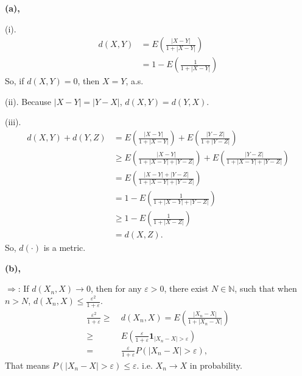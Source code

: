 \documentclass[en, normal, 11pt, black]{elegantnote}
\newenvironment{solution}{\begin{tcolorbox}[colback=white, colframe=black!50, breakable, title=Solution. ]\setlength{\parskip}{0.8em}}{\end{tcolorbox}}
\begin{document}
    \begin{solution}
        {\bfseries (a), }

        (i). 
        \[
            \begin{aligned}
                d(X,Y)&=E\left(\frac{|X-Y|}{1+|X-Y|}\right)\\
                &=1-E\left(\frac{1}{1+|X-Y|}\right)
            \end{aligned}
        \]
        So, if $d(X,Y)=0$, then $X=Y$, a.s. 
        
        (ii). Because $|X-Y|=|Y-X|$, $d(X,Y)=d(Y,X)$. 

        (iii). 
        \[
            \begin{aligned}
                d(X,Y)+d(Y,Z)&=E\left(\frac{|X-Y|}{1+|X-Y|}\right)+E\left(\frac{|Y-Z|}{1+|Y-Z|}\right)\\
                &\geqslant E\left(\frac{|X-Y|}{1+|X-Y|+|Y-Z|}\right)+E\left(\frac{|Y-Z|}{1+|X-Y|+|Y-Z|}\right)\\
                &=E\left(\frac{|X-Y|+|Y-Z|}{1+|X-Y|+|Y-Z|}\right)\\
                &=1-E\left(\frac{1}{1+|X-Y|+|Y-Z|}\right)\\
                &\geqslant 1-E\left(\frac{1}{1+|X-Z|}\right)\\
                &=d(X,Z). 
            \end{aligned}
        \]
        So, $d(\cdot)$ is a metric. 

        {\bfseries (b), } 

        $\Longrightarrow$: If $d(X_n,X)\to 0$, then for any $\varepsilon>0$, there exist $N\in\mathbb{N}$, such that when $n>N$, $d(X_n,X)\leqslant \frac{\varepsilon^2}{1+\varepsilon}$. 
        \[
            \begin{aligned}
                \frac{\varepsilon^2}{1+\varepsilon}\geqslant&\ d(X_n,X)=E\left(\frac{|X_n-X|}{1+|X_n-X|}\right)\\
                \geqslant&\ E\left(\frac{\varepsilon}{1+\varepsilon}\mathbf{1}_{|X_n-X|>\varepsilon}\right)\\
                =&\ \frac{\varepsilon}{1+\varepsilon}P\left(|X_n-X|>\varepsilon\right), 
            \end{aligned}
        \]
        That means $P\left(|X_n-X|>\varepsilon\right)\leqslant\varepsilon$. i.e. $X_n\to X$ in probability. 


\end{solution}
\end{document}
